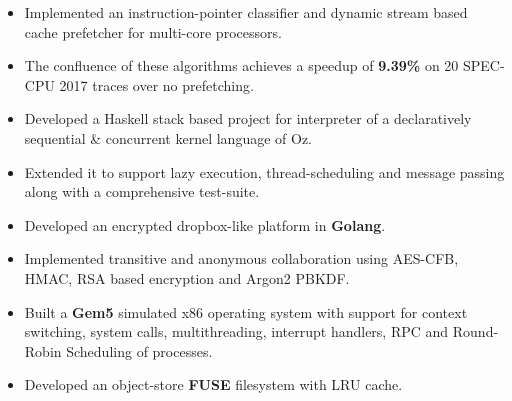 \documentclass[10pt, margin=0.5in]{deedy-resume-openfont}
\begin{document}
\begin{minipage}[t]{0.48\textwidth}
\vspace{5pt}
\begin{itemize}[leftmargin=*, noitemsep]
    \item Implemented an instruction-pointer classifier and dynamic stream based cache prefetcher 
for multi-core processors.
	\item The confluence of these algorithms achieves a speedup of \textbf{9.39\%} on 20 SPEC-CPU 2017 traces over no prefetching.
\end{itemize}

\vspace{5pt}
\begin{itemize}[leftmargin=*, noitemsep]
    \item Developed a Haskell stack based project for interpreter of a declaratively sequential \&
    concurrent kernel language of Oz.
    \item Extended it to support lazy execution, thread-scheduling and message passing
    along with a comprehensive test-suite.
\end{itemize}

\vspace{5pt}
\begin{itemize}[leftmargin=*, noitemsep]
  \item Developed an encrypted dropbox-like platform in \textbf{Golang}.
  \item Implemented transitive and anonymous collaboration using AES-CFB, HMAC, RSA based encryption and Argon2 PBKDF.
\end{itemize}

\vspace{5pt}
\begin{itemize}[leftmargin=*, noitemsep]
  \item Built a \textbf{Gem5} simulated x86 operating system with support for context switching, system calls, multithreading, interrupt handlers, RPC and Round-Robin Scheduling of processes.
  \item Developed an object-store \textbf{FUSE} filesystem with LRU cache.
\end{itemize}


\end{minipage}
\end{document}
